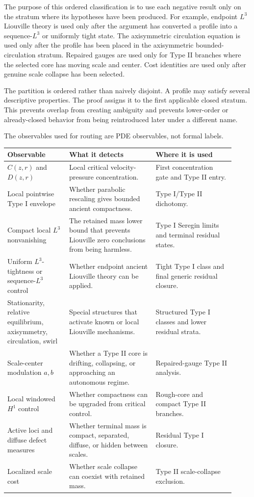 \documentclass[11pt]{amsart}
\begin{document}
The purpose of this ordered classification is to use each negative result only on the stratum where its hypotheses have been produced.  For example, endpoint \(L^3\) Liouville theory is used only after the argument has converted a profile into a sequence-\(L^3\) or uniformly tight state.  The axisymmetric circulation equation is used only after the profile has been placed in the axisymmetric bounded-circulation stratum.  Repaired gauges are used only for Type II branches where the selected core has moving scale and center.  Cost identities are used only after genuine scale collapse has been selected.

The partition is ordered rather than naively disjoint.  A profile may satisfy several descriptive properties.  The proof assigns it to the first applicable closed stratum.  This prevents overlap from creating ambiguity and prevents lower-order or already-closed behavior from being reintroduced later under a different name.

The observables used for routing are PDE observables, not formal labels.

\begin{longtable}{@{}>{\raggedright\arraybackslash}p{0.25\linewidth}>{\raggedright\arraybackslash}p{0.35\linewidth}>{\raggedright\arraybackslash}p{0.32\linewidth}@{}}
\toprule
\textbf{Observable} & \textbf{What it detects} & \textbf{Where it is used} \\
\midrule
\endhead
\(C(z,r)\) and \(D(z,r)\) & Local critical velocity-pressure concentration. & First concentration gate and Type II entry. \\
Local pointwise Type I envelope & Whether parabolic rescaling gives bounded ancient compactness. & Type I/Type II dichotomy. \\
Compact local \(L^3\) nonvanishing & The retained mass lower bound that prevents Liouville zero conclusions from being harmless. & Type I Seregin limits and terminal residual states. \\
Uniform \(L^3\)-tightness or sequence-\(L^3\) control & Whether endpoint ancient Liouville theory can be applied. & Tight Type I class and final generic residual closure. \\
Stationarity, relative equilibrium, axisymmetry, circulation, swirl & Special structures that activate known or local Liouville mechanisms. & Structured Type I classes and lower residual strata. \\
Scale-center modulation \(a,b\) & Whether a Type II core is drifting, collapsing, or approaching an autonomous regime. & Repaired-gauge Type II analysis. \\
Local windowed \(H^1\) control & Whether compactness can be upgraded from critical control. & Rough-core and compact Type II branches. \\
Active loci and diffuse defect measures & Whether terminal mass is compact, separated, diffuse, or hidden between scales. & Residual Type I closure. \\
Localized scale cost & Whether scale collapse can coexist with retained mass. & Type II scale-collapse exclusion. \\
\bottomrule
\end{longtable}
\end{document}
